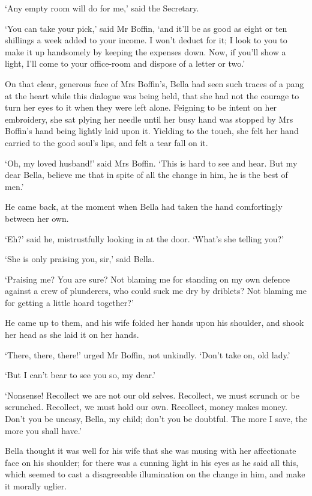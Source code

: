 ‘Any empty room will do for me,’ said the Secretary.

‘You can take your pick,’ said Mr Boffin, ‘and it’ll be as good as eight
or ten shillings a week added to your income. I won’t deduct for it; I
look to you to make it up handsomely by keeping the expenses down. Now,
if you’ll show a light, I’ll come to your office-room and dispose of a
letter or two.’

On that clear, generous face of Mrs Boffin’s, Bella had seen such traces
of a pang at the heart while this dialogue was being held, that she
had not the courage to turn her eyes to it when they were left alone.
Feigning to be intent on her embroidery, she sat plying her needle until
her busy hand was stopped by Mrs Boffin’s hand being lightly laid upon
it. Yielding to the touch, she felt her hand carried to the good soul’s
lips, and felt a tear fall on it.

‘Oh, my loved husband!’ said Mrs Boffin. ‘This is hard to see and hear.
But my dear Bella, believe me that in spite of all the change in him, he
is the best of men.’

He came back, at the moment when Bella had taken the hand comfortingly
between her own.

‘Eh?’ said he, mistrustfully looking in at the door. ‘What’s she telling
you?’

‘She is only praising you, sir,’ said Bella.

‘Praising me? You are sure? Not blaming me for standing on my own
defence against a crew of plunderers, who could suck me dry by driblets?
Not blaming me for getting a little hoard together?’

He came up to them, and his wife folded her hands upon his shoulder, and
shook her head as she laid it on her hands.

‘There, there, there!’ urged Mr Boffin, not unkindly. ‘Don’t take on,
old lady.’

‘But I can’t bear to see you so, my dear.’

‘Nonsense! Recollect we are not our old selves. Recollect, we must
scrunch or be scrunched. Recollect, we must hold our own. Recollect,
money makes money. Don’t you be uneasy, Bella, my child; don’t you be
doubtful. The more I save, the more you shall have.’

Bella thought it was well for his wife that she was musing with her
affectionate face on his shoulder; for there was a cunning light in
his eyes as he said all this, which seemed to cast a disagreeable
illumination on the change in him, and make it morally uglier.



